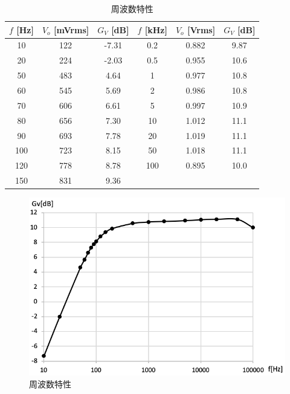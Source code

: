 \documentclass[titlepage]{jsarticle}
\begin{document}
                \begin{table}[h]
                    \caption{周波数特性}
                    \label{tab:amp}
                    \centering
                    \begin{tabular}{ccc||ccc} \hline
                        $f$ [Hz] & $V_o$ [mVrms] & $G_V$ [dB] & $f$ [kHz] & $V_o$ [Vrms] & $G_V$ [dB] \\ \hline
                        10 & 122 & -7.31 & 0.2 & 0.882 & 9.87 \\
                        20 & 224 & -2.03 & 0.5 & 0.955 & 10.6 \\
                        50 & 483 & 4.64 & 1 & 0.977 & 10.8 \\
                        60 & 545 & 5.69 & 2 & 0.986 & 10.8 \\
                        70 & 606 & 6.61 & 5 & 0.997 & 10.9 \\
                        80 & 656 & 7.30 & 10 & 1.012 & 11.1 \\
                        90 & 693 & 7.78 & 20 & 1.019 & 11.1 \\
                        100 & 723 & 8.15 & 50 & 1.018 & 11.1 \\
                        120 & 778 & 8.78 & 100 & 0.895 & 10.0 \\
                        150 & 831 & 9.36 & & & \\ \hline
                    \end{tabular}
                \end{table}

                \begin{figure}[h]
                    \centering
                    \includegraphics[width=0.7\hsize]{images/amp.png}
                    \caption{周波数特性}
                    \label{fig:amp}
                \end{figure}
\end{document}
